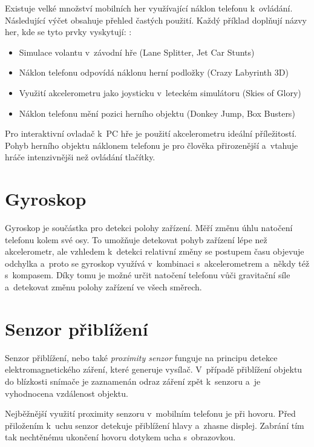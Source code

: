 \documentclass[thesis=B,czech,hidelinks]{FITthesis}[2012/06/26] %
\begin{document}
Existuje velké množství mobilních her využívající náklon telefonu k~ovládání. Následující výčet obsahuje přehled častých použití. Každý příklad doplňují názvy her, kde se tyto prvky vyskytují: \cite{accelerometergames}:

\begin{itemize}
	\item Simulace volantu v~závodní hře (Lane Splitter, Jet Car Stunts)
	\item Náklon telefonu odpovídá náklonu herní podložky (Crazy Labyrinth 3D)
	\item Využití akcelerometru jako joysticku v~leteckém simulátoru (Skies of Glory)
	\item Náklon telefonu mění pozici herního objektu (Donkey Jump, Box Busters)
\end{itemize}

Pro interaktivní ovladač k~PC hře je použití akcelerometru ideální příležitostí. Pohyb herního objektu náklonem telefonu je pro člověka přirozenější a~vtahuje hráče intenzivnějši než ovládání tlačítky. 

\section{Gyroskop}

Gyroskop je součástka pro detekci polohy zařízení. Měří změnu úhlu natočení telefonu kolem své osy. To umožňuje detekovat pohyb zařízení lépe než akcelerometr, ale vzhledem k~detekci relativní změny se postupem času objevuje odchylka a~proto se gyroskop využívá v~kombinaci s~akcelerometrem a~někdy též s~kompasem. Díky tomu je možné určit natočení telefonu vůči gravitační síle a~detekovat změnu polohy zařízení ve všech směrech. \cite{gyroscope}

\section{Senzor přiblížení}

Senzor přiblížení, nebo také \textit{proximity senzor} funguje na principu detekce elektromagnetického záření, které generuje vysílač. V~případě přiblížení objektu do blízkosti snímače je zaznamenán odraz záření zpět k~senzoru a~je vyhodnocena vzdálenost objektu. \cite{proximity}

Nejběžnější využití proximity senzoru v~mobilním telefonu je při hovoru. Před přiložením k~uchu senzor detekuje přiblížení hlavy a~zhasne displej. Zabrání tím tak nechtěnému ukončení hovoru dotykem ucha s~obrazovkou.
\end{document}
